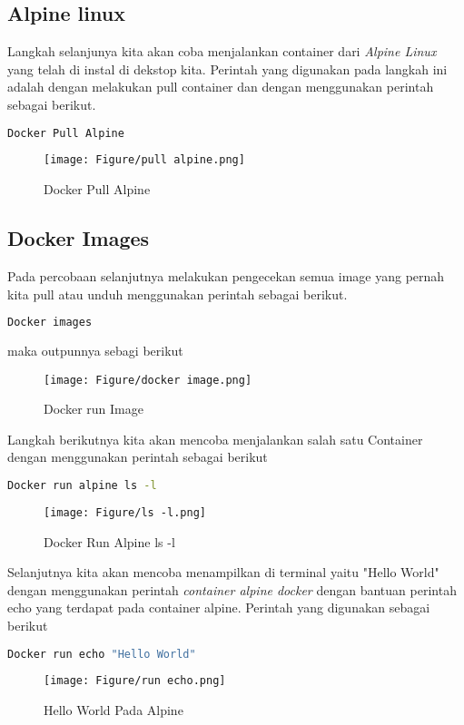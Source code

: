 \documentclass[11pt,a4paper]{article}
\begin{document}
\subsection{Alpine linux}
Langkah selanjunya kita akan coba menjalankan container dari \textit{Alpine Linux} yang telah di instal di dekstop kita. Perintah yang digunakan pada langkah ini adalah dengan melakukan pull container dan dengan menggunakan perintah sebagai berikut.
\begin{lstlisting}[language = bash]
	Docker Pull Alpine
\end{lstlisting}
\begin{figure}[h]
	\centering
	\texttt{[image: Figure/pull alpine.png]}
	\caption{Docker Pull Alpine}
\end{figure}

\subsection{Docker Images}
Pada percobaan selanjutnya melakukan pengecekan semua image yang pernah kita pull atau unduh menggunakan perintah sebagai berikut.
\begin{lstlisting}[language = bash]
	Docker images
\end{lstlisting}
maka outpunnya sebagi berikut
\begin{figure}[h]
	\centering
	\texttt{[image: Figure/docker image.png]}
	\caption{Docker run Image}
\end{figure}
Langkah berikutnya kita akan mencoba menjalankan salah satu Container dengan menggunakan perintah sebagai berikut
\begin{lstlisting}[language = bash]
	Docker run alpine ls -l
\end{lstlisting} 
\begin{figure}[h]
	\centering
	\texttt{[image: Figure/ls -l.png]}
	\caption{Docker Run Alpine ls -l}
\end{figure}
Selanjutnya kita akan mencoba menampilkan di terminal yaitu "Hello World" dengan menggunakan perintah \textit{container alpine docker} dengan bantuan perintah echo yang terdapat pada container alpine. Perintah yang digunakan sebagai berikut
\begin{lstlisting}[language=bash]
	Docker run echo "Hello World"
\end{lstlisting}
\begin{figure}[h]
	\centering
	\texttt{[image: Figure/run echo.png]}
	\caption{Hello World Pada Alpine}
\end{figure}
\end{document}
